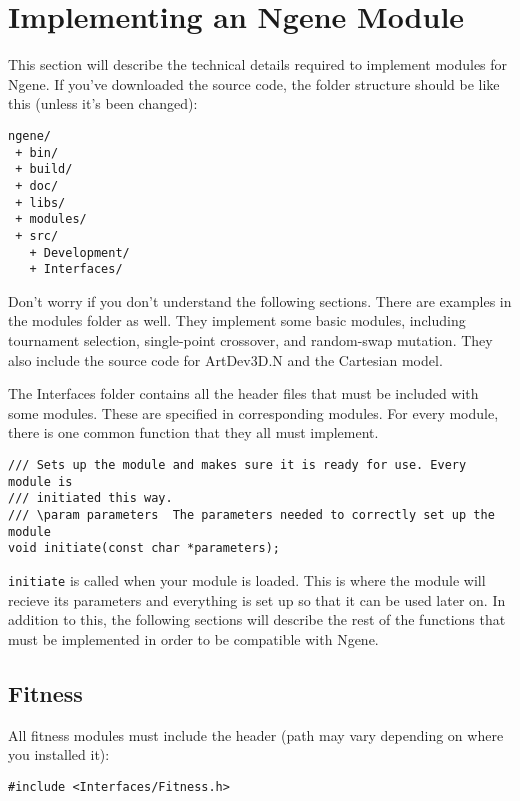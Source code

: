 \appendix

\section{Implementing an Ngene Module}
This section will describe the technical details required to implement modules for Ngene. If you've downloaded the source code, the folder structure should be like this (unless it's been changed):

\begin{verbatim}
ngene/
 + bin/
 + build/
 + doc/
 + libs/
 + modules/
 + src/
   + Development/
   + Interfaces/
\end{verbatim}

\noindent Don't worry if you don't understand the following sections. There are examples in the modules folder as well. They implement some basic modules, including tournament selection, single-point crossover, and random-swap mutation. They also include the source code for ArtDev3D.N and the Cartesian model.

The Interfaces folder contains all the header files that must be included with some modules. These are specified in corresponding modules. For every module, there is one common function that they all must implement.

\begin{verbatim}
/// Sets up the module and makes sure it is ready for use. Every module is
/// initiated this way.
/// \param parameters  The parameters needed to correctly set up the module
void initiate(const char *parameters);
\end{verbatim}

\noindent\texttt{initiate} is called when your module is loaded. This is where the module will recieve its parameters and everything is set up so that it can be used later on. In addition to this, the following sections will describe the rest of the functions that must be implemented in order to be compatible with Ngene.

\subsection{Fitness}

All fitness modules must include the header (path may vary depending on where you installed it):

\begin{verbatim}
#include <Interfaces/Fitness.h>
\end{verbatim}

